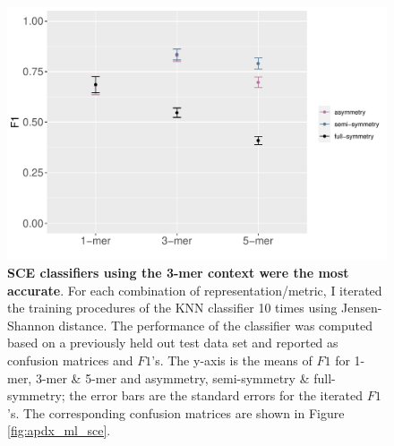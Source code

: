 \begin{figure}[ht!]
    \includegraphics[scale=0.75]{graphics/f1_sce.pdf}
    \caption{\textbf{SCE classifiers using the 3-mer context  were the most accurate}. For each combination of representation/metric, I iterated the training procedures of the KNN classifier 10 times using Jensen-Shannon distance. The performance of the classifier was computed based on a previously held out test data set and reported as confusion matrices and $F1$'s. The y-axis is the means of $F1$ for 1-mer, 3-mer \& 5-mer and asymmetry, semi-symmetry \& full-symmetry; the error bars are the standard errors for the iterated $F1$’s. The corresponding confusion matrices are shown in Figure \ref{fig:apdx_ml_sce}.}
    \label{fig:f1_sce}
\end{figure}
